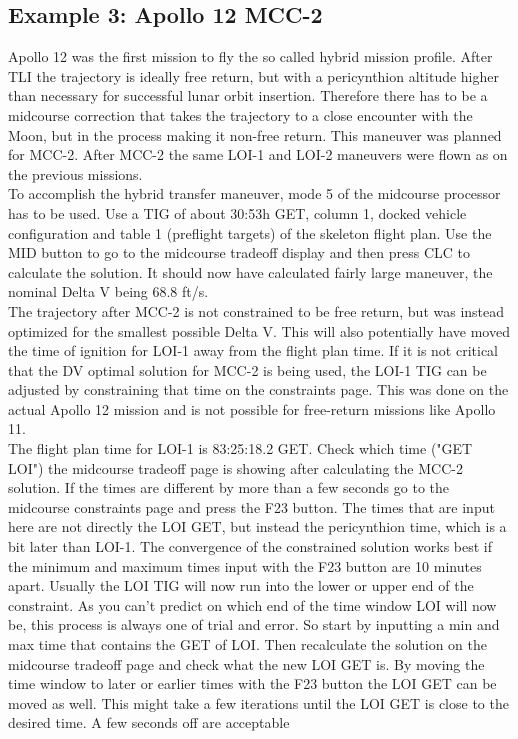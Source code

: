 \documentclass[11pt]{article} %
\begin{document}
\subsection{Example 3: Apollo 12 MCC-2}

Apollo 12 was the first mission to fly the so called hybrid mission profile. After TLI the trajectory is ideally free return, but with a pericynthion altitude higher than necessary for successful lunar orbit insertion. Therefore there has to be a midcourse correction that takes the trajectory to a close encounter with the Moon, but in the process making it non-free return. This maneuver was planned for MCC-2. After MCC-2 the same LOI-1 and LOI-2 maneuvers were flown as on the previous missions.\\

To accomplish the hybrid transfer maneuver, mode 5 of the midcourse processor has to be used. Use a TIG of about 30:53h GET, column 1, docked vehicle configuration and table 1 (preflight targets) of the skeleton flight plan. Use the MID button to go to the midcourse tradeoff display and then press CLC to calculate the solution. It should now have calculated fairly large maneuver, the nominal Delta V being 68.8 ft/s.\\

The trajectory after MCC-2 is not constrained to be free return, but was instead optimized for the smallest possible Delta V. This will also potentially have moved the time of ignition for LOI-1 away from the flight plan time. If it is not critical that the DV optimal solution for MCC-2 is being used, the LOI-1 TIG can be adjusted by constraining that time on the constraints page. This was done on the actual Apollo 12 mission and is not possible for free-return missions like Apollo 11.\\

The flight plan time for LOI-1 is 83:25:18.2 GET. Check which time ("GET LOI") the midcourse tradeoff page is showing after calculating the MCC-2 solution. If the times are different by more than a few seconds go to the midcourse constraints page and press the F23 button. The times that are input here are not directly the LOI GET, but instead the pericynthion time, which is a bit later than LOI-1. The convergence of the constrained solution works best if the minimum and maximum times input with the F23 button are 10 minutes apart. Usually the LOI TIG will now run into the lower or upper end of the constraint. As you can't predict on which end of the time window LOI will now be, this process is always one of trial and error. So start by inputting a min and max time that contains the GET of LOI. Then recalculate the solution on the midcourse tradeoff page and check what the new LOI GET is. By moving the time window to later or earlier times with the F23 button the LOI GET can be moved as well. This might take a few iterations until the LOI GET is close to the desired time. A few seconds off are acceptable\\
\end{document}

